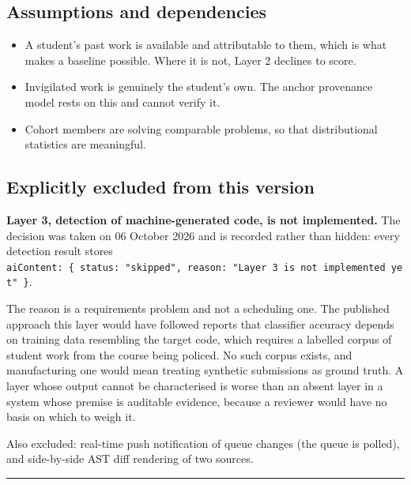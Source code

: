 \hypertarget{assumptions-and-dependencies}{%
\subsection{Assumptions and
dependencies}\label{assumptions-and-dependencies}}

\begin{itemize}
\tightlist
\item
  A student's past work is available and attributable to them, which is
  what makes a baseline possible. Where it is not, Layer 2 declines to
  score.
\item
  Invigilated work is genuinely the student's own. The anchor provenance
  model rests on this and cannot verify it.
\item
  Cohort members are solving comparable problems, so that distributional
  statistics are meaningful.
\end{itemize}

\hypertarget{explicitly-excluded-from-this-version}{%
\subsection{Explicitly excluded from this
version}\label{explicitly-excluded-from-this-version}}

\textbf{Layer 3, detection of machine-generated code, is not
implemented.} The decision was taken on 06 October 2026 and is recorded
rather than hidden: every detection result stores
\texttt{aiContent:\ \{\ status:\ "skipped",\ reason:\ "Layer\ 3\ is\ not\ implemented\ yet"\ \}}.

The reason is a requirements problem and not a scheduling one. The
published approach this layer would have followed reports that
classifier accuracy depends on training data resembling the target code,
which requires a labelled corpus of student work from the course being
policed. No such corpus exists, and manufacturing one would mean
treating synthetic submissions as ground truth. A layer whose output
cannot be characterised is worse than an absent layer in a system whose
premise is auditable evidence, because a reviewer would have no basis on
which to weigh it.

Also excluded: real-time push notification of queue changes (the queue
is polled), and side-by-side AST diff rendering of two sources.

\begin{center}\rule{0.5\linewidth}{0.5pt}\end{center}

